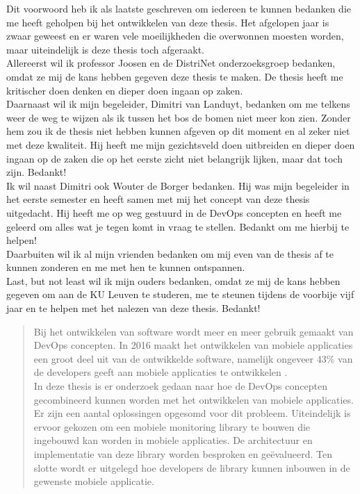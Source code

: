 \documentclass[master=cws,masteroption=se]{kulemt}
\begin{document}
\begin{preface}
Dit voorwoord heb ik als laatste geschreven om iedereen te kunnen bedanken die me heeft geholpen bij het ontwikkelen van deze thesis. Het afgelopen jaar is zwaar geweest en er waren vele moeilijkheden die overwonnen moesten worden, maar uiteindelijk is deze thesis toch afgeraakt. \\

Allereerst wil ik professor Joosen en de DistriNet onderzoeksgroep bedanken, omdat ze mij de kans hebben gegeven deze thesis te maken. De thesis heeft me kritischer doen denken en dieper doen ingaan op zaken. \\

Daarnaast wil ik mijn begeleider, Dimitri van Landuyt, bedanken om me telkens weer de weg te wijzen als ik tussen het bos de bomen niet meer kon zien. Zonder hem zou ik de thesis niet hebben kunnen afgeven op dit moment en al zeker niet met deze kwaliteit. Hij heeft me mijn gezichtsveld doen uitbreiden en dieper doen ingaan op de zaken die op het eerste zicht niet belangrijk lijken, maar dat toch zijn. Bedankt! \\

Ik wil naast Dimitri ook Wouter de Borger bedanken. Hij was mijn begeleider in het eerste semester en heeft samen met mij het concept van deze thesis uitgedacht. Hij heeft me op weg gestuurd in de DevOps concepten en heeft me geleerd om alles wat je tegen komt in vraag te stellen. Bedankt om me hierbij te helpen! \\

Daarbuiten wil ik al mijn vrienden bedanken om mij even van de thesis af te kunnen zonderen en me met hen te kunnen ontspannen. \\

Last, but not least wil ik mijn ouders bedanken, omdat ze mij de kans hebben gegeven om aan de KU Leuven te studeren, me te steunen tijdens de voorbije vijf jaar en te helpen met het nalezen van deze thesis. Bedankt!

  
  
\end{preface}

\tableofcontents*

\begin{abstract}
Bij het ontwikkelen van software wordt meer en meer gebruik gemaakt van DevOps concepten. In 2016 maakt het ontwikkelen van mobiele applicaties een groot deel uit van de ontwikkelde software, namelijk ongeveer 43\% van de developers geeft aan mobiele applicaties te ontwikkelen \cite{MobApp}. \\
In deze thesis is er onderzoek gedaan naar hoe de DevOps concepten gecombineerd kunnen worden met het ontwikkelen van mobiele applicaties. Er zijn een aantal oplossingen opgesomd voor dit probleem. Uiteindelijk is ervoor gekozen om een mobiele monitoring library te bouwen die ingebouwd kan worden in mobiele applicaties. De architectuur en implementatie van deze library worden besproken en ge\"evalueerd. Ten slotte wordt er uitgelegd hoe developers de library kunnen inbouwen in de gewenste mobiele applicatie. 
\end{abstract}
\end{document}
